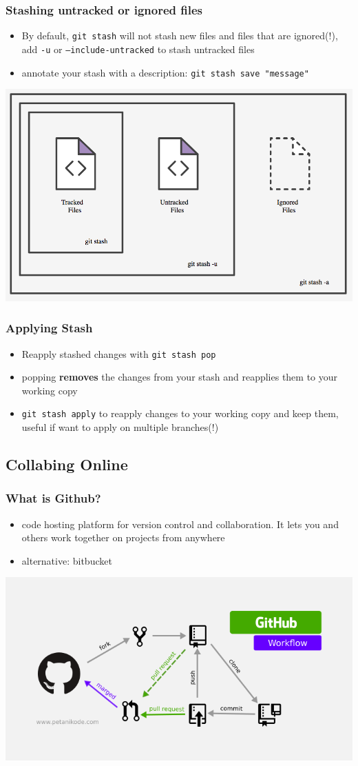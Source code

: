 \documentclass[12pt]{beamer}
\begin{document}
\begin{frame}
\frametitle{Stashing untracked or ignored files}
\begin{itemize}
\item By default, \texttt{git stash} will not stash new files and files that are ignored(!), add \texttt{-u} or \texttt{--include-untracked} to stash untracked files
\item annotate your stash with a description: \texttt{git stash save "message"}
\end{itemize}
\begin{center}
\includegraphics[width=0.5\linewidth]{stash_options}
\end{center}
\end{frame}

\begin{frame}
\frametitle{Applying Stash}
\begin{itemize}
\item Reapply stashed changes with \texttt{git stash pop}
\item popping \textbf{removes} the changes from your stash and reapplies them to your working copy
\item \texttt{git stash apply} to reapply changes to your working copy and keep them, useful if want to apply on multiple branches(!)
\end{itemize}
\end{frame}


\subsection{Collabing Online}
\begin{frame}
\frametitle{What is Github?}
\begin{itemize}
	\item code hosting platform for version control and collaboration. It lets you and others work together on projects from anywhere
	\item alternative: bitbucket
\end{itemize}
\begin{center}
	\includegraphics[width=0.75\linewidth]{github-workflow}
\end{center}
\end{frame}
\end{document}
